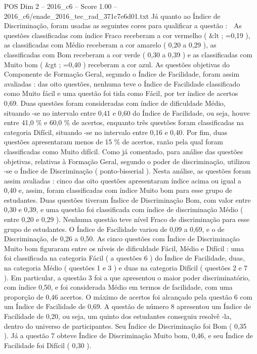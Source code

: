 \begin{textsample}{POS Dim 2 – 2016\_c6 – Score 1.00 – 2016\_c6/enade\_2016\_tec\_rad\_371c7e6d01.txt}
Já quanto ao Índice de Discriminação, foram usadas as seguintes cores para qualificar a questão :  As questões classificadas com índice Fraco receberam a cor vermelho ( \&lt ; =0,19 ), as classificadas com Médio receberam a cor amarelo ( 0,20 a 0,29 ), as classificadas com Bom receberam a cor verde ( 0,30 a 0,39 ) e as classificadas com Muito bom ( \&gt ; =0,40 ) receberam a cor azul.
As questões objetivas do Componente de Formação Geral, segundo o Índice de Facilidade, foram assim avaliadas : das oito questões, nenhuma teve o Índice de Facilidade classificado como Muito fácil e uma questão foi tida como Fácil, por ter índice de acertos 0,69.
Duas questões foram consideradas com índice de dificuldade Médio, situando -se no intervalo entre 0,41 e 0,60 do Índice de Facilidade, ou seja, houve entre 41,0 \% e 60,0 \% de acertos, enquanto três questões foram classificadas na categoria Difícil, situando -se no intervalo entre 0,16 e 0,40.
Por fim, duas questões apresentaram menos de 15 \% de acertos, razão pela qual foram classificadas como Muito difícil.
Como já comentado, para análise das questões objetivas, relativas à Formação Geral, segundo o poder de discriminação, utilizou -se o Índice de Discriminação ( ponto-bisserial ).
Nesta análise, as questões foram assim avaliadas : cinco das oito questões apresentaram índice acima ou igual a 0,40 e, assim, foram classificadas com índice Muito bom para esse grupo de estudantes.
Duas questões tiveram Índice de Discriminação Bom, com valor entre 0,30 e 0,39, e uma questão foi classificada com índice de discriminação Médio ( entre 0,20 e 0,29 ).
Nenhuma questão teve nível Fraco de discriminação para esse grupo de estudantes.
O Índice de Facilidade variou de 0,09 a 0,69, e o de Discriminação, de 0,26 a 0,50.
As cinco questões com Índice de Discriminação Muito bom figuraram entre os níveis de dificuldade Fácil, Médio e Difícil : uma foi classificada na categoria Fácil ( a questões 6 ) do Índice de Facilidade, duas, na categoria Médio ( questões 1 e 3 ) e duas na categoria Difícil ( questões 2 e 7 ).
Em particular, a questão 3 foi a que apresentou o maior poder discriminatório, com índice 0,50, e foi considerada Médio em termos de facilidade, com uma proporção de 0,46 acertos.
O máximo de acertos foi alcançado pela questão 6 com um Índice de Facilidade de 0,69.
A questão de número 8 apresentou um Índice de Facilidade de 0,20, ou seja, um quinto dos estudantes conseguiu resolvê -la, dentro do universo de participantes.
Seu Índice de Discriminação foi Bom ( 0,35 ).
Já a questão 7 obteve Índice de Discriminação Muito bom, 0,46, e seu Índice de Facilidade foi Difícil ( 0,30 ).

\end{textsample}
